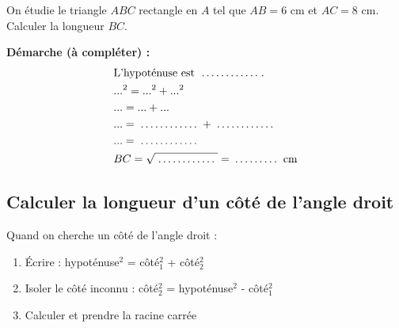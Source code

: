 \begin{examplebox}
	On étudie le triangle $ABC$ rectangle en $A$ tel que $AB=6$ cm et $AC=8$ cm. Calculer la longueur $BC$.
	
	\noindent
	\begin{minipage}[c]{0.58\textwidth}
		\textbf{Démarche (à compléter) :}
		\begin{align*}
			&\text{L'hypoténuse est } \trous{2cm}.\\
			&...^2 = ...^2 + ...^2\\
			&... = ... + ...\\
			&... = \trous{2cm} + \trous{2cm}\\
			&... = \trous{2cm}\\
			&BC = \sqrt{\trous{2cm}} = \trous{1.5cm}\ \text{cm}
		\end{align*}
	\end{minipage}
	\hfill
	\begin{minipage}[c]{0.38\textwidth}
		\centering
	\end{minipage}
\end{examplebox}


\subsection{Calculer la longueur d'un côté de l'angle droit}

\begin{methodebox}
	Quand on cherche un côté de l'angle droit :
	\begin{enumerate}
		\item Écrire : hypoténuse$^2$ = côté$_1^2$ + côté$_2^2$
		\item Isoler le côté inconnu : côté$_2^2$ = hypoténuse$^2$ - côté$_1^2$
		\item Calculer et prendre la racine carrée
	\end{enumerate}
\end{methodebox}

